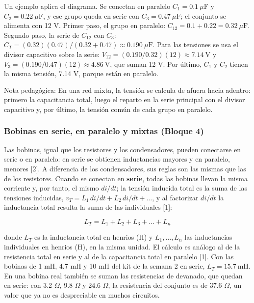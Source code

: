 \documentclass[11pt,letterpaper]{article}
\begin{document}
Un ejemplo aplica el diagrama. Se conectan en paralelo $C_1 = 0.1\ \mu\text{F}$ y $C_2 = 0.22\ \mu\text{F}$, y ese grupo queda en serie con $C_3 = 0.47\ \mu\text{F}$; el conjunto se alimenta con 12 V. Primer paso, el grupo en paralelo: $C_{12} = 0.1 + 0.22 = 0.32\ \mu\text{F}$. Segundo paso, la serie de $C_{12}$ con $C_3$: $C_T = (0.32)(0.47)/(0.32 + 0.47) \approx 0.190\ \mu\text{F}$. Para las tensiones se usa el divisor capacitivo sobre la serie: $V_{12} = (0.190/0.32)(12) \approx 7.14\ \text{V}$ y $V_3 = (0.190/0.47)(12) \approx 4.86\ \text{V}$, que suman 12 V. Por último, $C_1$ y $C_2$ tienen la misma tensión, 7.14 V, porque están en paralelo.

\begin{nota}{Nota pedagógica:}
En una red mixta, la tensión se calcula de afuera hacia adentro: primero la capacitancia total, luego el reparto en la serie principal con el divisor capacitivo y, por último, la tensión común de cada grupo en paralelo.
\end{nota}

\subsubsection{Bobinas en serie, en paralelo y mixtas (Bloque 4)}

Las bobinas, igual que los resistores y los condensadores, pueden conectarse en serie o en paralelo: en serie se obtienen inductancias mayores y en paralelo, menores [2]. A diferencia de los condensadores, sus reglas son las mismas que las de los resistores. Cuando se conectan en \textbf{serie}, todas las bobinas llevan la misma corriente y, por tanto, el mismo $di/dt$; la tensión inducida total es la suma de las tensiones inducidas, $v_T = L_1\,di/dt + L_2\,di/dt + \dots$, y al factorizar $di/dt$ la inductancia total resulta la suma de las individuales [1]:

\begin{equation}
  L_T = L_1 + L_2 + L_3 + \dots + L_n
\end{equation}

donde $L_T$ es la inductancia total en henrios (H) y $L_1, \dots, L_n$ las inductancias individuales en henrios (H), en la misma unidad. El cálculo es análogo al de la resistencia total en serie y al de la capacitancia total en paralelo [1]. Con las bobinas de 1 mH, 4.7 mH y 10 mH del kit de la semana 2 en serie, $L_T = 15.7\ \text{mH}$. En una bobina real también se suman las resistencias de devanado, que quedan en serie: con 3.2 \ensuremath{\Omega}, 9.8 \ensuremath{\Omega} y 24.6 \ensuremath{\Omega}, la resistencia del conjunto es de 37.6 \ensuremath{\Omega}, un valor que ya no es despreciable en muchos circuitos.
\end{document}
